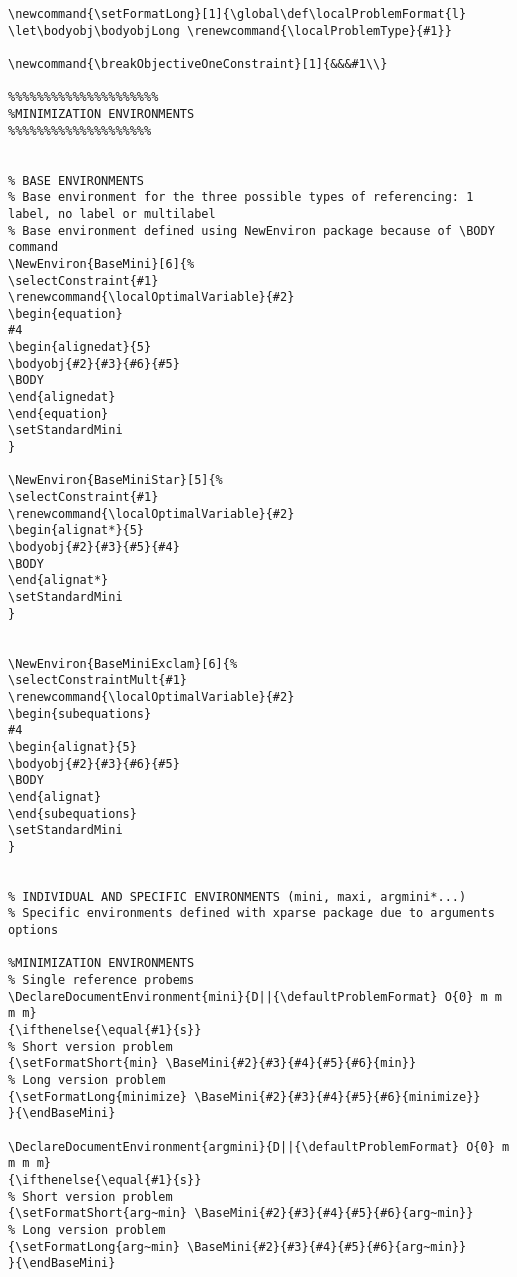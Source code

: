 \documentclass[a4paper]{article}
\begin{document}
\begin{lstlisting}
\newcommand{\setFormatLong}[1]{\global\def\localProblemFormat{l} \let\bodyobj\bodyobjLong \renewcommand{\localProblemType}{#1}}

\newcommand{\breakObjectiveOneConstraint}[1]{&&&#1\\}

%%%%%%%%%%%%%%%%%%%%%
%MINIMIZATION ENVIRONMENTS
%%%%%%%%%%%%%%%%%%%%


% BASE ENVIRONMENTS
% Base environment for the three possible types of referencing: 1 label, no label or multilabel
% Base environment defined using NewEnviron package because of \BODY command
\NewEnviron{BaseMini}[6]{%
\selectConstraint{#1}
\renewcommand{\localOptimalVariable}{#2}
\begin{equation}
#4
\begin{alignedat}{5}
\bodyobj{#2}{#3}{#6}{#5}
\BODY
\end{alignedat}
\end{equation}	
\setStandardMini
}

\NewEnviron{BaseMiniStar}[5]{%
\selectConstraint{#1}
\renewcommand{\localOptimalVariable}{#2}
\begin{alignat*}{5}
\bodyobj{#2}{#3}{#5}{#4}
\BODY
\end{alignat*}
\setStandardMini
}


\NewEnviron{BaseMiniExclam}[6]{%
\selectConstraintMult{#1}
\renewcommand{\localOptimalVariable}{#2}
\begin{subequations}
#4
\begin{alignat}{5}
\bodyobj{#2}{#3}{#6}{#5}
\BODY
\end{alignat}
\end{subequations}
\setStandardMini
}


% INDIVIDUAL AND SPECIFIC ENVIRONMENTS (mini, maxi, argmini*...)
% Specific environments defined with xparse package due to arguments options

%MINIMIZATION ENVIRONMENTS
% Single reference probems
\DeclareDocumentEnvironment{mini}{D||{\defaultProblemFormat} O{0} m m m m}
{\ifthenelse{\equal{#1}{s}}
% Short version problem
{\setFormatShort{min} \BaseMini{#2}{#3}{#4}{#5}{#6}{min}}
% Long version problem	
{\setFormatLong{minimize} \BaseMini{#2}{#3}{#4}{#5}{#6}{minimize}}
}{\endBaseMini}

\DeclareDocumentEnvironment{argmini}{D||{\defaultProblemFormat} O{0} m m m m}
{\ifthenelse{\equal{#1}{s}}
% Short version problem
{\setFormatShort{arg~min} \BaseMini{#2}{#3}{#4}{#5}{#6}{arg~min}}
% Long version problem	
{\setFormatLong{arg~min} \BaseMini{#2}{#3}{#4}{#5}{#6}{arg~min}}
}{\endBaseMini}



\end{lstlisting}
\end{document}
